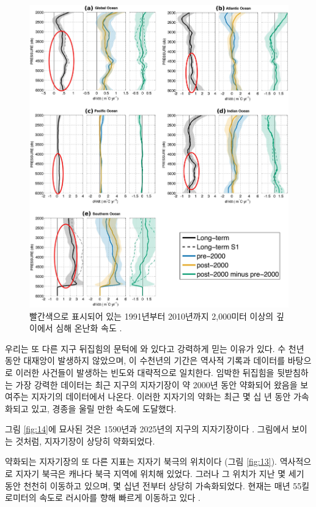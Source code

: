 \documentclass[10pt,twocolumn,letterpaper]{article}
\begin{document}
\begin{figure}[t]
\begin{center}
   \includegraphics[width=1\linewidth]{ocean-highlight.jpg}
\end{center}
   \caption{빨간색으로 표시되어 있는 1991년부터 2010년까지 2,000미터 이상의 깊이에서 심해 온난화 속도 \cite{132}.}
\label{fig:15}
\label{fig:onecol}
\end{figure}

우리는 또 다른 지구 뒤집힘의 문턱에 와 있다고 강력하게 믿는 이유가 있다. 수 천년 동안 대재앙이 발생하지 않았으며, 이 수천년의 기간은 역사적 기록과 데이터를 바탕으로 이러한 사건들이 발생하는 빈도와 대략적으로 일치한다. 임박한 뒤집힘을 뒷받침하는 가장 강력한 데이터는 최근 지구의 지자기장이 약 2000년 동안 약화되어 왔음을 보여주는 지자기의 데이터에서 나온다. 이러한 지자기의 약화는 최근 몇 십 년 동안 가속화되고 있고, 경종을 울릴 만한 속도에 도달했다.

그림 \ref{fig:14}에 묘사된 것은 1590년과 2025년의 지구의 지자기장이다 \cite{125,126}. 그림에서 보이는 것처럼, 지자기장이 상당히 약화되었다.

약화되는 지자기장의 또 다른 지표는 지자기 북극의 위치이다 (그림 \ref{fig:13}). 역사적으로 지자기 북극은 캐나다 북극 지역에 위치해 있었다. 그러나 그 위치가 지난 몇 세기 동안 천천히 이동하고 있으며, 몇 십년 전부터 상당히 가속화되었다. 현재는 매년 55킬로미터의 속도로 러시아를 향해 빠르게 이동하고 있다 \cite{124}.
\end{document}
